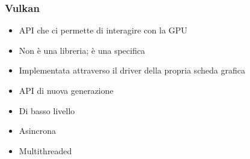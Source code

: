 \begin{frame}
\frametitle{Vulkan}

\begin{itemize}
\item API che ci permette di interagire con la GPU
\item Non è una libreria; è una specifica
\item Implementata attraverso il driver della propria scheda grafica
\item API di nuova generazione
\item Di basso livello
\item Asincrona
\item Multithreaded
\end{itemize}

\end{frame}
